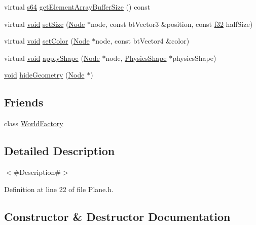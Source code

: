 \begin{DoxyCompactItemize}
virtual \mbox{\hyperlink{_util_8h_a4258bfb2c3a440d06c4aaa3c2b450dde}{s64}} \mbox{\hyperlink{classnjli_1_1_plane_a5826539217d13c19c72ed6504d1b6d15}{get\+Element\+Array\+Buffer\+Size}} () const
\item 
virtual \mbox{\hyperlink{_thread_8h_af1e856da2e658414cb2456cb6f7ebc66}{void}} \mbox{\hyperlink{classnjli_1_1_plane_a69ac7f253c3a2a068f9fd20526dbfa3d}{set\+Size}} (\mbox{\hyperlink{classnjli_1_1_node}{Node}} $\ast$node, const bt\+Vector3 \&position, const \mbox{\hyperlink{_util_8h_a5f6906312a689f27d70e9d086649d3fd}{f32}} half\+Size)
\item 
virtual \mbox{\hyperlink{_thread_8h_af1e856da2e658414cb2456cb6f7ebc66}{void}} \mbox{\hyperlink{classnjli_1_1_plane_a60396b5d7d0d1984cb05703a843cce79}{set\+Color}} (\mbox{\hyperlink{classnjli_1_1_node}{Node}} $\ast$node, const bt\+Vector4 \&color)
\item 
virtual \mbox{\hyperlink{_thread_8h_af1e856da2e658414cb2456cb6f7ebc66}{void}} \mbox{\hyperlink{classnjli_1_1_plane_a12d8dcbd747c9d03aba34dbf864e4478}{apply\+Shape}} (\mbox{\hyperlink{classnjli_1_1_node}{Node}} $\ast$node, \mbox{\hyperlink{classnjli_1_1_physics_shape}{Physics\+Shape}} $\ast$physics\+Shape)
\item 
\mbox{\hyperlink{_thread_8h_af1e856da2e658414cb2456cb6f7ebc66}{void}} \mbox{\hyperlink{classnjli_1_1_plane_a3394026e187763e245fcf11c483bb75c}{hide\+Geometry}} (\mbox{\hyperlink{classnjli_1_1_node}{Node}} $\ast$)
\end{DoxyCompactItemize}
\subsection*{Friends}
\begin{DoxyCompactItemize}
\item 
class \mbox{\hyperlink{classnjli_1_1_plane_acb96ebb09abe8f2a37a915a842babfac}{World\+Factory}}
\end{DoxyCompactItemize}


\subsection{Detailed Description}
$<$\#\+Description\#$>$ 

Definition at line 22 of file Plane.\+h.



\subsection{Constructor \& Destructor Documentation}
\mbox{\label{classnjli_1_1_plane_a076eefa748e73d4740b3478b8893c31d}} 
